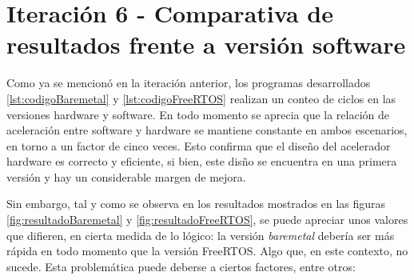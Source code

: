 \section{Iteración 6 - Comparativa de resultados frente a versión software}
Como ya se mencionó en la iteración anterior, los programas desarrollados \ref{lst:codigoBaremetal} y \ref{lst:codigoFreeRTOS} realizan un conteo de ciclos en las versiones hardware y software. En todo momento se aprecia que la relación de aceleración entre software y hardware se mantiene constante en ambos escenarios, en torno a un factor de cinco veces. Esto confirma que el diseño del acelerador hardware es correcto y eficiente, si bien, este disño se encuentra en una primera versión y hay un considerable margen de mejora.

Sin embargo, tal y como se observa en los resultados mostrados en las figuras \ref{fig:resultadoBaremetal} y \ref{fig:resultadoFreeRTOS}, se puede apreciar unos valores que difieren, en cierta medida de lo lógico: la versión \textit{baremetal} debería ser más rápida en todo momento que la versión FreeRTOS. Algo que, en este contexto, no sucede. Esta problemática puede deberse a ciertos factores, entre otros:

